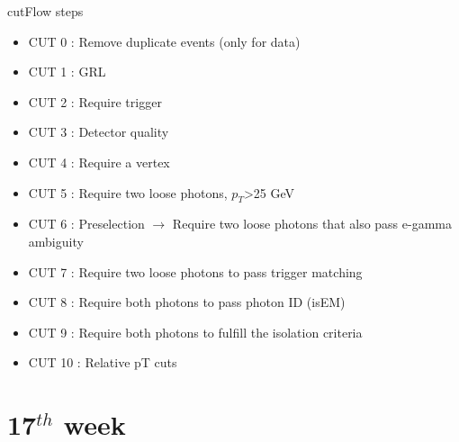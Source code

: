 \documentclass[10pt,UKenglish, leqno, xcolor = dvipsnames]{beamer}
\begin{document}
		\begin{frame}{cutFlow steps}
			\vfill
			\begin{itemize} 
				\item CUT 0 : Remove duplicate events (only for data) 
				\item CUT 1 : GRL
				\item CUT 2 : Require trigger
				\item CUT 3 : Detector quality
				\item CUT 4 : Require a vertex
				\item CUT 5 : Require two loose photons, $p_T$>25 GeV
				\item CUT 6 : Preselection $\to$ Require two loose photons that also pass e-gamma ambiguity
				\item CUT 7 : Require two loose photons to pass trigger matching
				\item CUT 8 : Require both photons to pass photon ID (isEM)
				\item CUT 9 : Require both photons to fulfill the isolation criteria
				\item CUT 10 : Relative pT cuts
			\end{itemize}
			\vfill
		\end{frame}
	
	\section{17$^{th}$ week}
	\SectionPage
		
\end{document}
